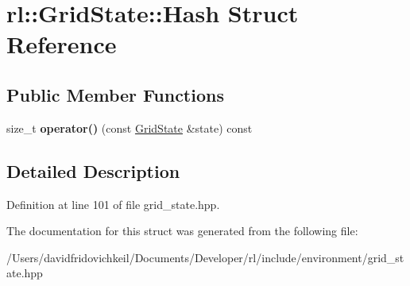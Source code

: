 \hypertarget{structrl_1_1_grid_state_1_1_hash}{}\section{rl\+:\+:Grid\+State\+:\+:Hash Struct Reference}
\label{structrl_1_1_grid_state_1_1_hash}
\subsection*{Public Member Functions}
\begin{DoxyCompactItemize}
\item 
\hypertarget{structrl_1_1_grid_state_1_1_hash_a45f7e666d08533a618f8ac3188702599}{}\label{structrl_1_1_grid_state_1_1_hash_a45f7e666d08533a618f8ac3188702599} 
size\+\_\+t {\bfseries operator()} (const \hyperlink{structrl_1_1_grid_state}{Grid\+State} \&state) const
\end{DoxyCompactItemize}


\subsection{Detailed Description}


Definition at line 101 of file grid\+\_\+state.\+hpp.



The documentation for this struct was generated from the following file\+:\begin{DoxyCompactItemize}
\item 
/\+Users/davidfridovichkeil/\+Documents/\+Developer/rl/include/environment/grid\+\_\+state.\+hpp\end{DoxyCompactItemize}
